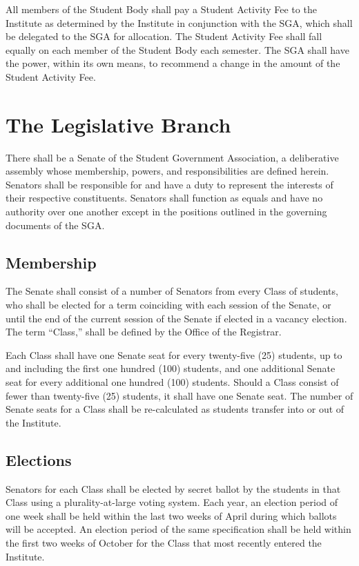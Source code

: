 \documentclass[12pt,oneside]{scrreprt}
\begin{document}
All members of the Student Body shall pay a Student Activity Fee to the Institute as determined by the Institute in conjunction with the SGA, which shall be delegated to the SGA for allocation. The Student Activity Fee shall fall equally on each member of the Student Body each semester. The SGA shall have the power, within its own means, to recommend a change in the amount of the Student Activity Fee.

\chapter{The Legislative Branch}
There shall be a Senate of the Student Government Association, a deliberative assembly whose membership, powers, and responsibilities are defined herein. Senators shall be responsible for and have a duty to represent the interests of their respective constituents. Senators shall function as equals and have no authority over one another except in the positions outlined in the governing documents of the SGA.

\section{Membership}
The Senate shall consist of a number of Senators from every Class of students, who shall be elected for a term coinciding with each session of the Senate, or until the end of the current session of the Senate if elected in a vacancy election. The term ``Class,'' shall be defined by the Office of the Registrar.

Each Class shall have one Senate seat for every twenty-five (25) students, up to and including the first one hundred (100) students, and one additional Senate seat for every additional one hundred (100) students. Should a Class consist of fewer than twenty-five (25) students, it shall have one Senate seat. The number of Senate seats for a Class shall be re-calculated as students transfer into or out of the Institute.

\section{Elections}
Senators for each Class shall be elected by secret ballot by the students in that Class using a plurality-at-large voting system. Each year, an election period of one week shall be held within the last two weeks of April during which ballots will be accepted. An election period of the same specification shall be held within the first two weeks of October for the Class that most recently entered the Institute.
\end{document}
